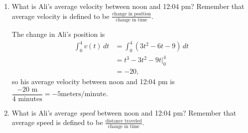 \documentclass[main]{subfiles}
\begin{document}
\begin{enumerate}[resume,topsep=0pt]
  \begin{enumerate}
  \item
    \begin{problem}[\stretch{2}]
      What is Ali's average velocity between noon and 12:04 pm?  Remember
      that average velocity is defined to be $\displaystyle
      \frac{\text{change in position}}{\text{change in time}}$.
    \end{problem}

    \begin{solution}
      The change in Ali's position is
      \begin{align*}
        \int_0^4 v(t)\,dt &=  \int_0^4 (3t^2 - 6t - 9)\, dt \\
        &= t^3 - 3t^2 - 9t \Big|_0^4 \\
        &= -20,
      \end{align*}
      so his average velocity between noon and 12:04 pm is $\dfrac{-20
        \text{ m}}{4 \text{ minutes}} = \boxed{-5 \text{
          meters/minute}}$. 
    \end{solution}

  \item
    \begin{problem}[\stretch{3}]
      What is Ali's average \emph{speed} between noon and 12:04 pm?
      Remember that average speed is defined to be $\displaystyle
      \frac{\text{distance traveled}}{\text{change in time}}$.
    \end{problem}


\end{enumerate}
\end{enumerate}
\end{document}
